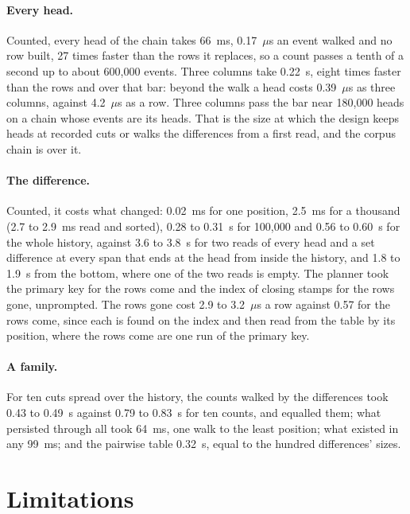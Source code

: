\documentclass[11pt]{article}
\theoremstyle{plain}
\theoremstyle{definition}
\begin{document}
\paragraph{Every head.} Counted, every head of the chain takes 66~ms, 0.17~$\mu$s an event walked
and no row built, 27 times faster than the rows it replaces, so a count passes a tenth of a second
up to about 600{,}000 events. Three columns take 0.22~s, eight times faster than the rows and over
that bar: beyond the walk a head costs 0.39~$\mu$s as three columns, against 4.2~$\mu$s as a row.
Three columns pass the bar near 180{,}000 heads on a chain whose events are its heads. That is the
size at which the design keeps heads at recorded cuts or walks the differences from a first read,
and the corpus chain is over it.

\paragraph{The difference.} Counted, it costs what changed: 0.02~ms for one position, 2.5~ms for
a thousand (2.7 to 2.9~ms read and sorted), 0.28 to 0.31~s for 100{,}000 and 0.56 to 0.60~s for
the whole history, against 3.6 to 3.8~s for two reads of every head and a set difference at every
span that ends at the head from inside the history, and 1.8 to 1.9~s from the bottom, where one
of the two reads is empty. The planner took the primary key for the rows come and the index of
closing stamps for the rows gone, unprompted. The
rows gone cost 2.9 to 3.2~$\mu$s a row against 0.57 for the rows come, since each is found on the
index and then read from the table by its position, where the rows come are one run of the
primary key.

\paragraph{A family.} For ten cuts spread over the history, the counts walked by the differences
took 0.43 to 0.49~s against 0.79 to 0.83~s for ten counts, and equalled them; what persisted
through all took 64~ms, one walk to the least position; what existed in any 99~ms; and the
pairwise table 0.32~s, equal to the hundred differences' sizes.

\section{Limitations}\label{sec:limits}
\end{document}

